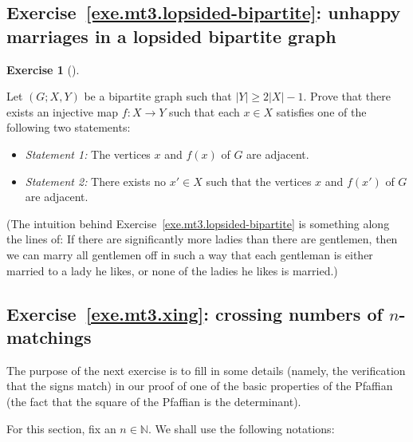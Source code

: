 \documentclass[numbers=enddot,12pt,final,onecolumn,notitlepage]{scrartcl}%
\newcounter{exer}
\theoremstyle{definition}
\newtheorem{exmp}[exer]{Exercise}
\newenvironment{exercise}[1][]
{\begin{exmp}[#1]\begin{leftbar}}
{\end{leftbar}\end{exmp}}
\newcommand{\NN}{\mathbb{N}}
\newcommand{\abs}[1]{\left| #1 \right|}
\newcommand{\tup}[1]{\left( #1 \right)}
\begin{document}
\subsection{Exercise~\ref{exe.mt3.lopsided-bipartite}:
unhappy marriages in a lopsided bipartite graph}

\begin{exercise} \label{exe.mt3.lopsided-bipartite}
Let $\tup{G; X, Y}$ be a bipartite graph such that
$\abs{Y} \geq 2 \abs{X} - 1$.
Prove that there exists an injective map
$f : X \to Y$ such that each $x \in X$ satisfies one
of the following two statements:

\begin{itemize}
\item \textit{Statement 1:} The vertices $x$ and $f \tup{x}$
      of $G$ are adjacent.

\item \textit{Statement 2:} There exists no $x' \in X$ such
      that the vertices $x$ and $f \tup{x'}$ of $G$ are
      adjacent.
\end{itemize}
\end{exercise}

(The intuition behind Exercise~\ref{exe.mt3.lopsided-bipartite}
is something along the lines of:
If there are significantly more ladies than there are
gentlemen, then we can marry all gentlemen off in such a
way that each gentleman is either married to a lady he
likes, or none of the ladies he likes is married.)

\subsection{Exercise~\ref{exe.mt3.xing}:
crossing numbers of $n$-matchings}

The purpose of the next exercise is to fill in some details
(namely, the verification that the signs match)
in our proof of one of the basic properties of the Pfaffian
(the fact that the square of the Pfaffian is the
determinant).

For this section, fix an $n \in \NN$.
We shall use the following notations:
\end{document}
